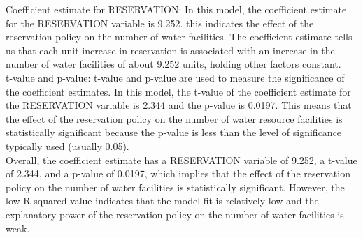 \documentclass[12pt,letterpaper]{article}
\begin{document}
Coefficient estimate for RESERVATION: In this model, the coefficient estimate for the RESERVATION variable is 9.252. this indicates the effect of the reservation policy on the number of water facilities. The coefficient estimate tells us that each unit increase in reservation is associated with an increase in the number of water facilities of about 9.252 units, holding other factors constant.\\

t-value and p-value: t-value and p-value are used to measure the significance of the coefficient estimates. In this model, the t-value of the coefficient estimate for the RESERVATION variable is 2.344 and the p-value is 0.0197. This means that the effect of the reservation policy on the number of water resource facilities is statistically significant because the p-value is less than the level of significance typically used (usually 0.05).\\

Overall, the coefficient estimate has a RESERVATION variable of 9.252, a t-value of 2.344, and a p-value of 0.0197, which implies that the effect of the reservation policy on the number of water facilities is statistically significant. However, the low R-squared value indicates that the model fit is relatively low and the explanatory power of the reservation policy on the number of water facilities is weak.
\end{document}
